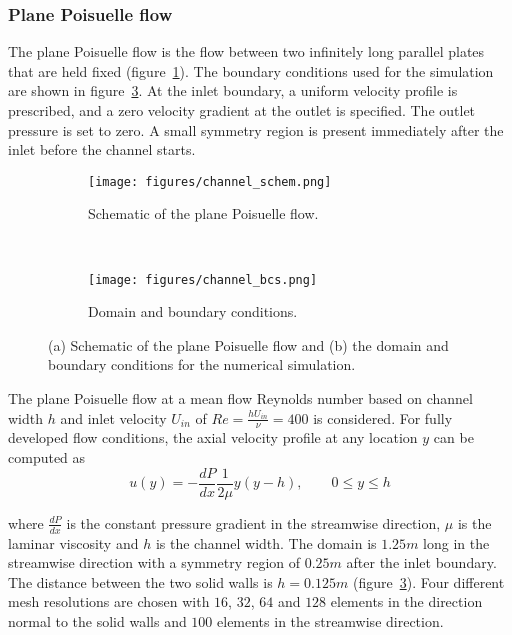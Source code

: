 \subsubsection{Plane Poisuelle flow}
The plane Poisuelle flow is the flow between two infinitely long parallel plates that are held fixed (figure~\ref{fig:channelschem}). The boundary conditions used for the simulation are shown in figure~\ref{fig:channelbcs}. At the inlet boundary, a uniform velocity profile is prescribed, and a zero velocity gradient at the outlet is specified. The outlet pressure is set to zero. A small symmetry region is present immediately after the inlet before the channel starts.
\begin{figure}[h!]
    \centering
    \captionsetup{justification=centering}
    \begin{subfigure}[b]{0.47\textwidth}
    \centering
    \captionsetup{justification=centering}
    \texttt{[image: figures/channel\_schem.png]}
    \caption{Schematic of the plane Poisuelle flow.}
     \label{fig:channelschem}
    \end{subfigure}
    ~ %
    \begin{subfigure}[b]{0.47\textwidth}
    \centering
    \captionsetup{justification=centering}
     \texttt{[image: figures/channel\_bcs.png]}
    \caption{Domain and boundary conditions.}
     \label{fig:channelbcs}
    \end{subfigure}
    \caption{(a) Schematic of the plane Poisuelle flow and (b) the domain and boundary conditions for the numerical simulation.}
\end{figure}
The plane Poisuelle flow at a mean flow Reynolds number based on channel width $h$ and inlet velocity $U_{in}$ of $Re = \frac{h U_{in}}{\nu} = 400$ is considered. For fully developed flow conditions, the axial velocity profile at any location $y$ can be computed as
\begin{equation}
    u(y)=-\frac{dP}{dx}\frac{1}{2\mu}y(y-h),\qquad 0\leq y \leq h
\end{equation}{}

\noindent where $\frac{dP}{dx}$ is the constant pressure gradient in the streamwise direction, $\mu$ is the laminar viscosity and $h$ is the channel width.
The domain is $1.25 m$ long in the streamwise direction with a symmetry region of $0.25 m$ after the inlet boundary. The distance between the two solid walls is $h=0.125 m$ (figure~\ref{fig:channelbcs}). Four different mesh resolutions are chosen with $16$, $32$, $64$ and $128$ elements in the direction normal to the solid walls and $100$ elements in the streamwise direction. 

